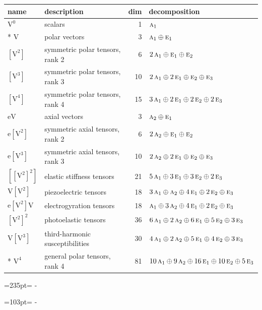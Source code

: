 \documentclass[10pt,a4paper]{article}
\newcommand{\needspace}[1]{\par\penalty-100\begingroup\dimen0=#1\relax\dimen2=\pagegoal
  \advance\dimen2-\pagetotal\ifdim\dimen0>\dimen2\relax\ifdim\dimen2>0pt\vfil\break\fi\fi
  \endgroup}
\numberwithin{equation}{section}
\newcommand{\irr}[1]{\text{\normalfont\scshape #1}}
\newcommand{\jahn}[1]{\mathrm{#1}}
\newlength{\fillwidth}\newlength{\cellwidth}\newlength{\colwidth}
\begin{document}
{\begin{longtable}{@{}llr>{\RaggedRight\arraybackslash}p{\fillwidth}@{}}
name & description & dim & decomposition\\\midrule\endhead
\bottomrule\endfoot\endlastfoot
$\jahn{V^{0}}$ & scalars & 1 & $\irr{a}_{1}$\\*
$\jahn{V}$ & polar vectors & 3 & $\irr{a}_{1} \oplus\allowbreak \irr{e}_{1}$\\
$\jahn{[V^{2}]}$ & symmetric polar tensors, rank 2 & 6 & $2\,\irr{a}_{1} \oplus\allowbreak \irr{e}_{1} \oplus\allowbreak \irr{e}_{2}$\\
$\jahn{[V^{3}]}$ & symmetric polar tensors, rank 3 & 10 & $2\,\irr{a}_{1} \oplus\allowbreak 2\,\irr{e}_{1} \oplus\allowbreak \irr{e}_{2} \oplus\allowbreak \irr{e}_{3}$\\
$\jahn{[V^{4}]}$ & symmetric polar tensors, rank 4 & 15 & $3\,\irr{a}_{1} \oplus\allowbreak 2\,\irr{e}_{1} \oplus\allowbreak 2\,\irr{e}_{2} \oplus\allowbreak 2\,\irr{e}_{3}$\\
$\jahn{eV}$ & axial vectors & 3 & $\irr{a}_{2} \oplus\allowbreak \irr{e}_{1}$\\
$\jahn{e[V^{2}]}$ & symmetric axial tensors, rank 2 & 6 & $2\,\irr{a}_{2} \oplus\allowbreak \irr{e}_{1} \oplus\allowbreak \irr{e}_{2}$\\
$\jahn{e[V^{3}]}$ & symmetric axial tensors, rank 3 & 10 & $2\,\irr{a}_{2} \oplus\allowbreak 2\,\irr{e}_{1} \oplus\allowbreak \irr{e}_{2} \oplus\allowbreak \irr{e}_{3}$\\
$\jahn{[[V^{2}]^{2}]}$ & elastic stiffness tensors & 21 & $5\,\irr{a}_{1} \oplus\allowbreak 3\,\irr{e}_{1} \oplus\allowbreak 3\,\irr{e}_{2} \oplus\allowbreak 2\,\irr{e}_{3}$\\
$\jahn{V[V^{2}]}$ & piezoelectric tensors & 18 & $3\,\irr{a}_{1} \oplus\allowbreak \irr{a}_{2} \oplus\allowbreak 4\,\irr{e}_{1} \oplus\allowbreak 2\,\irr{e}_{2} \oplus\allowbreak \irr{e}_{3}$\\
$\jahn{e[V^{2}]V}$ & electrogyration tensors & 18 & $\irr{a}_{1} \oplus\allowbreak 3\,\irr{a}_{2} \oplus\allowbreak 4\,\irr{e}_{1} \oplus\allowbreak 2\,\irr{e}_{2} \oplus\allowbreak \irr{e}_{3}$\\
$\jahn{[V^{2}]^{2}}$ & photoelastic tensors & 36 & $6\,\irr{a}_{1} \oplus\allowbreak 2\,\irr{a}_{2} \oplus\allowbreak 6\,\irr{e}_{1} \oplus\allowbreak 5\,\irr{e}_{2} \oplus\allowbreak 3\,\irr{e}_{3}$\\
$\jahn{V[V^{3}]}$ & third-harmonic susceptibilities & 30 & $4\,\irr{a}_{1} \oplus\allowbreak 2\,\irr{a}_{2} \oplus\allowbreak 5\,\irr{e}_{1} \oplus\allowbreak 4\,\irr{e}_{2} \oplus\allowbreak 3\,\irr{e}_{3}$\\*
$\jahn{V^{4}}$ & general polar tensors, rank 4 & 81 & $10\,\irr{a}_{1} \oplus\allowbreak 9\,\irr{a}_{2} \oplus\allowbreak 16\,\irr{e}_{1} \oplus\allowbreak 10\,\irr{e}_{2} \oplus\allowbreak 5\,\irr{e}_{3}$\\
\bottomrule\end{longtable}}
\needspace{235pt}
\needspace{103pt}
\end{document}

